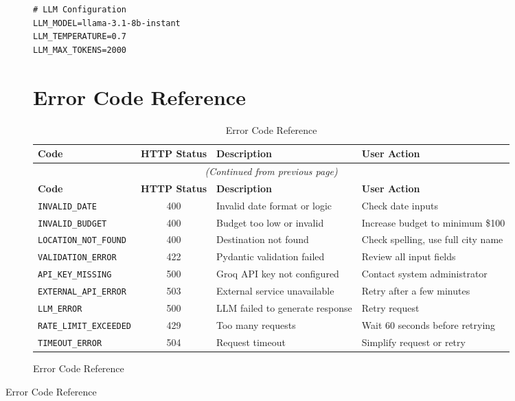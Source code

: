 \documentclass[12pt,a4paper]{report}
\newcommand{\code}[1]{\texttt{#1}}
\begin{document}
\begin{figure}[H]
\begin{plantuml}
\begin{figure}[H]
\begin{plantuml}
\begin{lstlisting}[style=bashStyle, caption={.env.example Template}]
# LLM Configuration
LLM_MODEL=llama-3.1-8b-instant
LLM_TEMPERATURE=0.7
LLM_MAX_TOKENS=2000
\end{lstlisting}


\chapter{Error Code Reference}

\begin{longtable}{|l|c|p{5cm}|p{4cm}|}
\caption{Error Code Reference} \\
\hline
\textbf{Code} & \textbf{HTTP Status} & \textbf{Description} & \textbf{User Action} \\
\hline
\endfirsthead

\multicolumn{4}{c}{\textit{(Continued from previous page)}} \\
\hline
\textbf{Code} & \textbf{HTTP Status} & \textbf{Description} & \textbf{User Action} \\
\hline
\endhead

\hline
\endlastfoot

\code{INVALID\_DATE} & 400 & Invalid date format or logic & Check date inputs \\
\hline
\code{INVALID\_BUDGET} & 400 & Budget too low or invalid & Increase budget to minimum \$100 \\
\hline
\code{LOCATION\_NOT\_FOUND} & 400 & Destination not found & Check spelling, use full city name \\
\hline
\code{VALIDATION\_ERROR} & 422 & Pydantic validation failed & Review all input fields \\
\hline
\code{API\_KEY\_MISSING} & 500 & Groq API key not configured & Contact system administrator \\
\hline
\code{EXTERNAL\_API\_ERROR} & 503 & External service unavailable & Retry after a few minutes \\
\hline
\code{LLM\_ERROR} & 500 & LLM failed to generate response & Retry request \\
\hline
\code{RATE\_LIMIT\_EXCEEDED} & 429 & Too many requests & Wait 60 seconds before retrying \\
\hline
\code{TIMEOUT\_ERROR} & 504 & Request timeout & Simplify request or retry \\
\hline
\end{longtable}


\end{plantuml}
\end{figure}
\end{plantuml}
\end{figure}
\end{document}
